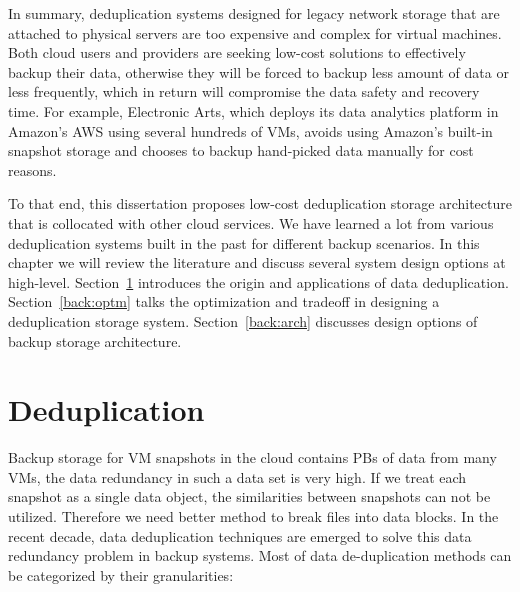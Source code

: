 In summary, deduplication systems designed for legacy network storage that are attached to
physical servers are too expensive and complex for virtual machines. 
Both cloud users and providers are seeking low-cost solutions to effectively backup
their data, otherwise they will be forced to backup less amount of data or less frequently,
which in return will compromise the data safety and recovery time. For example, Electronic Arts, which deploys
its data analytics platform in Amazon's AWS using several hundreds of VMs, 
avoids using Amazon's built-in snapshot storage and chooses to backup hand-picked data manually for cost reasons.

To that end, this dissertation proposes low-cost deduplication storage architecture that is
collocated with other cloud services. We have learned a lot from 
various deduplication systems built in the past for different backup scenarios. 
In this chapter we will review the literature and discuss several system design options at high-level.
Section~\ref{back:dedup} introduces the origin and applications of data deduplication.
Section~\ref{back:optm} talks the optimization and tradeoff in designing a deduplication storage system.
Section~\ref{back:arch} discusses design options of backup storage architecture.

\section{Deduplication}
\label{back:dedup}
Backup storage for VM snapshots in the cloud contains PBs of data from many VMs,
the data redundancy in such a data set is very high\cite{Jayaram2011, agrawal07}.
If we treat each snapshot as a single data object, the similarities between snapshots
can not be utilized. Therefore we need better method to break files into data blocks.
In the recent decade, data deduplication techniques are emerged to solve this data
redundancy problem in backup systems.
Most of data de-duplication methods can be categorized by their granularities:

